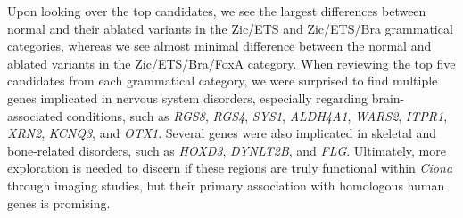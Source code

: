 Upon looking over the top candidates, we see the largest differences between normal and their ablated variants in the Zic/ETS and Zic/ETS/Bra grammatical categories, whereas we see almost minimal difference between the normal and ablated variants in the Zic/ETS/Bra/FoxA category. When reviewing the top five candidates from each grammatical category, we were surprised to find multiple genes implicated in nervous system disorders, especially regarding brain-associated conditions, such as \textit{RGS8}, \textit{RGS4}, \textit{SYS1}, \textit{ALDH4A1}, \textit{WARS2}, \textit{ITPR1}, \textit{XRN2}, \textit{KCNQ3}, and \textit{OTX1}. Several genes were also implicated in skeletal and bone-related disorders, such as \textit{HOXD3}, \textit{DYNLT2B}, and \textit{FLG}. Ultimately, more exploration is needed to discern if these regions are truly functional within \textit{Ciona} through imaging studies, but their primary association with homologous human genes is promising. 

